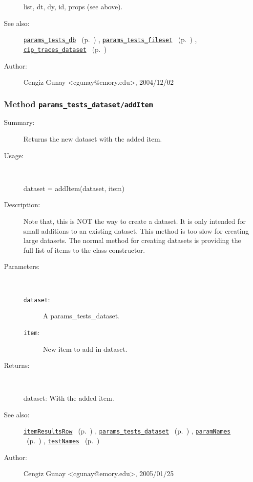 \begin{description}
	list, dt, dy, id, props (see above).
%
%
\item[See also:]%
\hyperlink{ref_params_tests_db}{\texttt{params\_tests\_db}}%
\ (p.~\pageref{ref_params_tests_db})%
%
, \hyperlink{ref_params_tests_fileset}{\texttt{params\_tests\_fileset}}%
\ (p.~\pageref{ref_params_tests_fileset})%
%
, \hyperlink{ref_cip_traces_dataset}{\texttt{cip\_traces\_dataset}}%
\ (p.~\pageref{ref_cip_traces_dataset})%
%
%
\item[Author:]%
Cengiz Gunay <cgunay@emory.edu>, 2004/12/02
%
\end{description}
\methodline%
\subsubsection[Method \texttt{addItem}]{Method \texttt{params\_tests\_dataset/addItem}}%
%
\label{ref_params_tests_dataset__addItem}%
\hypertarget{ref_params_tests_dataset__addItem}{}%
\begin{description}
\item[Summary:]Returns the new dataset with the added item.
%
\item[Usage:]~%
\begin{lyxcode}%
dataset = addItem(dataset, item)
%
\end{lyxcode}%
%
\item[Description:]%
Note that, this is NOT the way to create a dataset. It is only intended for 
 small additions to an existing dataset. This method is too slow
 for creating large datasets. The normal method for creating datasets is
 providing the full list of items to the class constructor.
\item[Parameters:]~
\begin{description}%
\item[\texttt{dataset}:]
 A params\_tests\_dataset.
\item[\texttt{item}:]
 New item to add in dataset.
\end{description}%
%
\item[Returns:
]~

	dataset: With the added item.
%
%
\item[See also:]%
\hyperlink{ref_itemResultsRow}{\texttt{itemResultsRow}}%
\ (p.~\pageref{ref_itemResultsRow})%
%
, \hyperlink{ref_params_tests_dataset}{\texttt{params\_tests\_dataset}}%
\ (p.~\pageref{ref_params_tests_dataset})%
%
, \hyperlink{ref_paramNames}{\texttt{paramNames}}%
\ (p.~\pageref{ref_paramNames})%
%
, \hyperlink{ref_testNames}{\texttt{testNames}}%
\ (p.~\pageref{ref_testNames})%
%
%
\item[Author:]%
Cengiz Gunay <cgunay@emory.edu>, 2005/01/25
%
\end{description}
\methodline%
